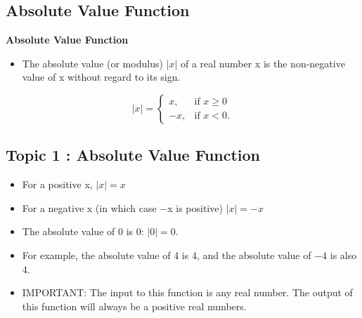 \documentclass[a4paper,12pt]{article}
\begin{document}

\subsection{Absolute Value Function}

\textbf{Absolute Value Function}
\begin{itemize}
\item The absolute value (or modulus) $|x|$ of a real number x is the non-negative value of x without regard to its sign. 

\end{itemize}
\[|x| = \begin{cases} x, & \mbox{if }  x \ge 0  \\ -x,  & \mbox{if } x < 0. \end{cases} \]


\subsection{Topic 1 : Absolute Value Function}

\begin{itemize}

\item For a positive x, $|x| = x$ 
\item For a negative x (in which case −x is positive) $|x| = -x$ 
\item The absolute value of 0 is 0:  $|0| = 0$. 
\item For example, the absolute value of 4 is 4, and the absolute value of $-4$ is also 4. 
\item IMPORTANT:  The input to this function is any real number. The output of this function will always be a positive real numbers.
\end{itemize}
\end{document}
